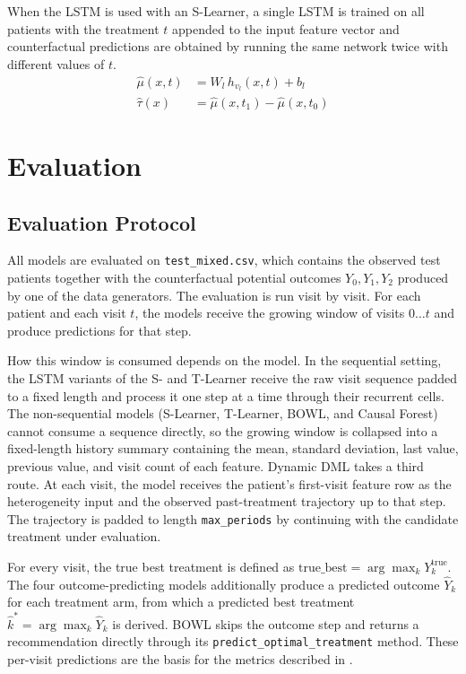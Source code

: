 \documentclass{article}
\begin{document}
When the LSTM is used with an S-Learner, a single LSTM is trained on all patients with the treatment $t$ appended to the input feature vector and counterfactual predictions are obtained by running the same network twice with different values of $t$. 
\begin{align}
    \hat{\mu}(x, t) &= W_l\, h_{v_l}(x, t) + b_l \\
    \hat{\tau}(x)   &= \hat{\mu}(x, t_1) - \hat{\mu}(x, t_0)
\end{align}




\section{Evaluation}

\subsection{Evaluation Protocol}
All models are evaluated on \texttt{test\_mixed.csv}, which 
contains the observed test patients together with the 
counterfactual potential outcomes $Y_0, Y_1, Y_2$ produced by 
one of the data generators. The evaluation is run visit by 
visit. For each patient and each visit $t$, the models receive 
the growing window of visits $0 \ldots t$ and produce 
predictions for that step.

How this window is consumed depends on the model. In the 
sequential setting, the LSTM variants of the S- and T-Learner 
receive the raw visit sequence padded to a fixed length and 
process it one step at a time through their recurrent cells. 
The non-sequential models (S-Learner, T-Learner, BOWL, and 
Causal Forest) cannot consume a sequence directly, so the 
growing window is collapsed into a fixed-length history 
summary containing the mean, standard deviation, last value, 
previous value, and visit count of each feature. Dynamic DML 
takes a third route. At each visit, the model receives the 
patient's first-visit feature row as the heterogeneity input 
and the observed past-treatment trajectory up to that step. 
The trajectory is padded to length \texttt{max\_periods} by 
continuing with the candidate treatment under evaluation.

For every visit, the true best treatment is defined as 
$\text{true\_best} = \arg\max_k Y_k^{\text{true}}$. The four 
outcome-predicting models additionally produce a predicted 
outcome $\hat{Y}_k$ for each treatment arm, from which a 
predicted best treatment $\hat{k}^* = \arg\max_k \hat{Y}_k$ is 
derived. BOWL skips the outcome step and returns a 
recommendation directly through its 
\texttt{predict\_optimal\_treatment} method. These per-visit 
predictions are the basis for the metrics described in 
.
\end{document}
